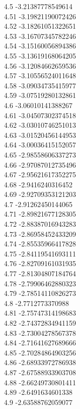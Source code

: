 {4.5	-3.21387778549614\\
4.51	-3.19821190072426\\
4.52	-3.18261051322651\\
4.53	-3.16707345782246\\
4.54	-3.15160056894386\\
4.55	-3.13619168064205\\
4.56	-3.12084662659536\\
4.57	-3.10556524011648\\
4.58	-3.09034735415977\\
4.59	-3.07519280132861\\
4.6	-3.06010141388267\\
4.61	-3.04507302374518\\
4.62	-3.03010746251013\\
4.63	-3.01520456144953\\
4.64	-3.00036415152057\\
4.65	-2.98558606337273\\
4.66	-2.97087012735496\\
4.67	-2.95621617352275\\
4.68	-2.9416240316452\\
4.69	-2.92709353121203\\
4.7	-2.91262450144065\\
4.71	-2.89821677128305\\
4.72	-2.88387016943283\\
4.73	-2.86958452433209\\
4.74	-2.85535966417828\\
4.75	-2.84119541693111\\
4.76	-2.82709161031935\\
4.77	-2.81304807184764\\
4.78	-2.79906462880323\\
4.79	-2.78514110826273\\
4.8	-2.7712773370988\\
4.81	-2.75747314198683\\
4.82	-2.74372834941159\\
4.83	-2.73004278567378\\
4.84	-2.71641627689666\\
4.85	-2.70284864903256\\
4.86	-2.68933972786938\\
4.87	-2.67588933903708\\
4.88	-2.66249730801411\\
4.89	-2.6491634601338\\
4.9	-2.63588762059077\\
}
